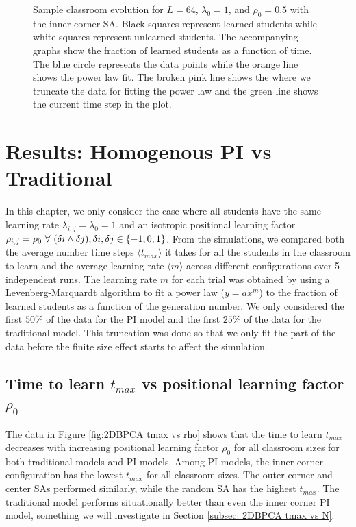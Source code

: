 \begin{figure}[htbp!]
    \caption{Sample classroom evolution for $L=64$, $\lambda_0 = 1$, and $\rho_0 = 0.5$ with the inner corner SA. 
    Black squares represent learned students while white squares represent unlearned students. 
    The accompanying graphs show the fraction of learned students as a function of time. 
    The blue circle represents the data points while the orange line shows the power law fit. 
    The broken pink line shows the where we truncate the data for fitting the power law and the green line shows the current time step in the plot.}
    \label{fig:Sample classroom evolution}
 \end{figure}

\section{Results: Homogenous PI vs Traditional}
In this chapter, we only consider the case where all students have the same learning rate $\lambda_{i,j} = \lambda_0 = 1$ and an isotropic positional learning factor $\rho_{i,j} = \rho_0 \space ~\forall~ (\delta i \land \delta j),  \delta i, \delta j \in \lbrace -1,0,1 \rbrace $. 
From the simulations, we compared both the average number time steps $\langle t_{max} \rangle$ it takes for all the students in the classroom to learn and the average learning rate $\langle m \rangle$ across different configurations over 5 independent runs.
 The learning rate $m$ for each trial was obtained by using a Levenberg-Marquardt algorithm to fit a power law ($y = ax^m$) to the fraction of learned students as a function of the generation number. 
 We only considered the first $50\%$ of the data for the PI model and the first $25\%$ of the data for the traditional model. 
This truncation was done so that we only fit the part of the data before the finite size effect starts to affect the simulation.

\subsection{Time to learn $t_{max}$ vs positional learning factor $\rho_0$} \label{subsec: 2DBPCA tmax vs rho}

The data in Figure \ref{fig:2DBPCA tmax vs rho} shows that the time to learn $t_{max}$ decreases with increasing positional learning factor $\rho_0$ for all classroom sizes for both traditional models and PI models. 
Among PI models, the inner corner configuration has the lowest $t_{max}$ for all classroom sizes. 
The outer corner and center SAs performed similarly, while the random SA has the highest $t_{max}$. 
The traditional model performs situationally better than even the inner corner PI model, something we will investigate in Section \ref{subsec: 2DBPCA tmax vs N}.

